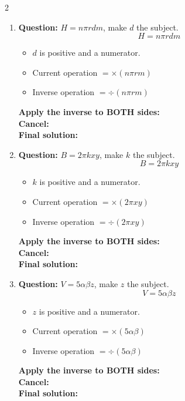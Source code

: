 \documentclass[11pt]{article}
\begin{document}
\begin{multicols}{2}
\begin{enumerate}[leftmargin=*, itemsep=10pt]
\item \textbf{Question:} \( H = n\pi rdm \), make \( d \) the subject.
\[
H=n\pi rdm
\]
\begin{itemize}[leftmargin=*, itemsep=2pt]
\item \(d\) is positive and a numerator.
\item Current operation \(= \times (n\pi rm)\)
\item Inverse operation \(= \div (n\pi rm)\)
\end{itemize}
\textbf{Apply the inverse to BOTH sides:} \\[1.5cm]
\textbf{Cancel:} \\[1.5cm]
\textbf{Final solution:}\\[1.5cm]

\newpage
\item \textbf{Question:} \( B = 2\pi kxy \), make \( k \) the subject.
\[
B=2\pi kxy
\]
\begin{itemize}[leftmargin=*, itemsep=2pt]
\item \(k\) is positive and a numerator.
\item Current operation \(= \times (2\pi xy)\)
\item Inverse operation \(= \div (2\pi xy)\)
\end{itemize}
\textbf{Apply the inverse to BOTH sides:} \\[1.5cm]
\textbf{Cancel:} \\[1.5cm]
\textbf{Final solution:}\\[1.5cm]

\item \textbf{Question:} \( V = 5\alpha\beta z \), make \( z \) the subject.
\[
V=5\alpha\beta z
\]
\begin{itemize}[leftmargin=*, itemsep=2pt]
\item \(z\) is positive and a numerator.
\item Current operation \(= \times (5\alpha\beta)\)
\item Inverse operation \(= \div (5\alpha\beta)\)
\end{itemize}
\textbf{Apply the inverse to BOTH sides:} \\[1.5cm]
\textbf{Cancel:} \\[1.5cm]
\textbf{Final solution:}\\[1.5cm]


\end{enumerate}
\end{multicols}
\end{document}
